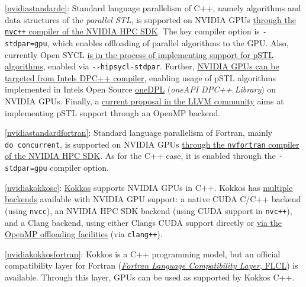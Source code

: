 \item \ref{nvidiastandardc}: Standard language parallelism of C++, namely algorithms and data structures of the \emph{parallel STL}, is supported on NVIDIA GPUs \href{https://docs.nvidia.com/hpc-sdk/compilers/c++-parallel-algorithms/index.html}{through the \texttt{nvc++} compiler of the NVIDIA HPC SDK}. The key compiler option is \texttt{-stdpar=gpu}, which enables offloading of parallel algorithms to the GPU. Also, currently Open SYCL \href{https://github.com/OpenSYCL/OpenSYCL/pull/1088}{is in the process of implementing support for pSTL algorithms}, enabled via \texttt{-\/-hipsycl-stdpar}. Further, \href{https://intel.github.io/llvm-docs/GetStartedGuide.html\#build-dpc-toolchain-with-support-for-nvidia-cuda}{NVIDIA GPUs can be targeted from Intel\textquotesingle s DPC++ compiler}, enabling usage of pSTL algorithms implemented in Intel\textquotesingle s Open Source \href{https://github.com/oneapi-src/oneDPL}{oneDPL} (\emph{oneAPI DPC++ Library}) on NVIDIA GPUs. Finally, a \href{https://discourse.llvm.org/t/rfc-openmp-offloading-backend-for-c-parallel-algorithms/73468}{current proposal in the LLVM community} aims at implementing pSTL support through an OpenMP backend.
\item \ref{nvidiastandardfortran}: Standard language parallelism of Fortran, mainly \texttt{do\ concurrent}, is supported on NVIDIA GPUs \href{https://developer.nvidia.com/blog/accelerating-fortran-do-concurrent-with-gpus-and-the-nvidia-hpc-sdk/}{through the \texttt{nvfortran} compiler of the NVIDIA HPC SDK}. As for the C++ case, it is enabled through the \texttt{-stdpar=gpu} compiler option.
\item \ref{nvidiakokkosc}: \href{https://github.com/kokkos/kokkos}{Kokkos} supports NVIDIA GPUs in C++. Kokkos has \href{https://kokkos.github.io/kokkos-core-wiki/requirements.html}{multiple backends} available with NVIDIA GPU support: a native CUDA C/C++ backend (using \texttt{nvcc}), an NVIDIA HPC SDK backend (using CUDA support in \texttt{nvc++}), and a Clang backend, using either Clang\textquotesingle s CUDA support directly or \href{https://docs.nersc.gov/development/programming-models/kokkos/}{via the OpenMP offloading facilities} (via \texttt{clang++}).
\item \ref{nvidiakokkosfortran}: Kokkos is a C++ programming model, but an official compatibility layer for Fortran (\href{https://github.com/kokkos/kokkos-fortran-interop}{\emph{Fortran Language Compatibility Layer}, FLCL}) is available. Through this layer, GPUs can be used as supported by Kokkos C++.
